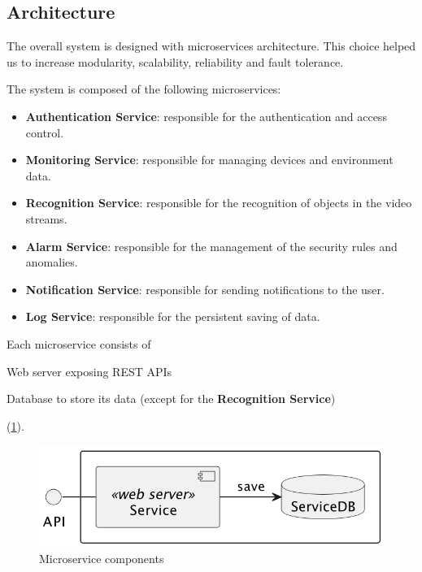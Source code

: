 \documentclass{scrartcl}
\begin{document}
    \subsection{Architecture}

    The overall system is designed with microservices architecture.
%
    This choice helped us to increase modularity, scalability, reliability and fault tolerance.

    The system is composed of the following microservices:
    \begin{itemize}
        \item \textbf{Authentication Service}: responsible for the authentication and access control.
        \item \textbf{Monitoring Service}: responsible for managing devices and environment data.
        \item \textbf{Recognition Service}: responsible for the recognition of objects in the video streams.
        \item \textbf{Alarm Service}: responsible for the management of the security rules and anomalies.
        \item \textbf{Notification Service}: responsible for sending notifications to the user.
        \item \textbf{Log Service}: responsible for the persistent saving of data.
    \end{itemize}

    Each microservice consists of
    \begin{enumerate*}
        \item Web server exposing REST APIs
        \item Database to store its data (except for the \textbf{Recognition Service})
    \end{enumerate*}
    (\cref{fig:microservice}).

    \begin{figure}
        \centering
        \includegraphics[scale=0.6]{img/microservice}
        \caption{Microservice components}
        \label{fig:microservice}
    \end{figure}
\end{document}
